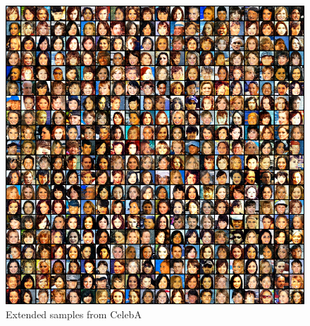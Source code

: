 \begin{figure}[h!]
    \centering
    \includegraphics[width=\linewidth]{figures/samples/celeba_samples_large.png}
    \caption{Extended samples from CelebA}
    \label{fig:celeba-samples-large}
\end{figure}


